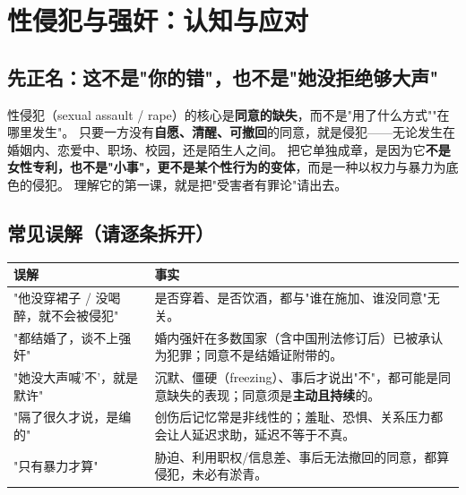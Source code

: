 
\chapter{性侵犯与强奸：认知与应对}

\section{先正名：这不是"你的错"，也不是"她没拒绝够大声"}
性侵犯（sexual assault / rape）的核心是\textbf{同意的缺失}，而不是"用了什么方式""在哪里发生"。
只要一方没有\textbf{自愿、清醒、可撤回}的同意，就是侵犯——无论发生在婚姻内、恋爱中、职场、校园，还是陌生人之间。
把它单独成章，是因为它\textbf{不是女性专利，也不是"小事"，更不是某个性行为的变体}，而是一种以权力与暴力为底色的侵犯。
理解它的第一课，就是把"受害者有罪论"请出去。

\section{常见误解（请逐条拆开）}
\begin{tabularx}{\textwidth}{l X}
\toprule
\textbf{误解} & \textbf{事实} \\
\midrule
"他没穿裙子 / 没喝醉，就不会被侵犯" & 是否穿着、是否饮酒，都与"谁在施加、谁没同意"无关。 \\
"都结婚了，谈不上强奸" & 婚内强奸在多数国家（含中国刑法修订后）已被承认为犯罪；同意不是结婚证附带的。 \\
"她没大声喊'不'，就是默许" & 沉默、僵硬（freezing）、事后才说出"不"，都可能是同意缺失的表现；同意须是\textbf{主动且持续}的。 \\
"隔了很久才说，是编的" & 创伤后记忆常是非线性的；羞耻、恐惧、关系压力都会让人延迟求助，延迟不等于不真。 \\
"只有暴力才算" & 胁迫、利用职权/信息差、事后无法撤回的同意，都算侵犯，未必有淤青。 \\
\bottomrule
\end{tabularx}

